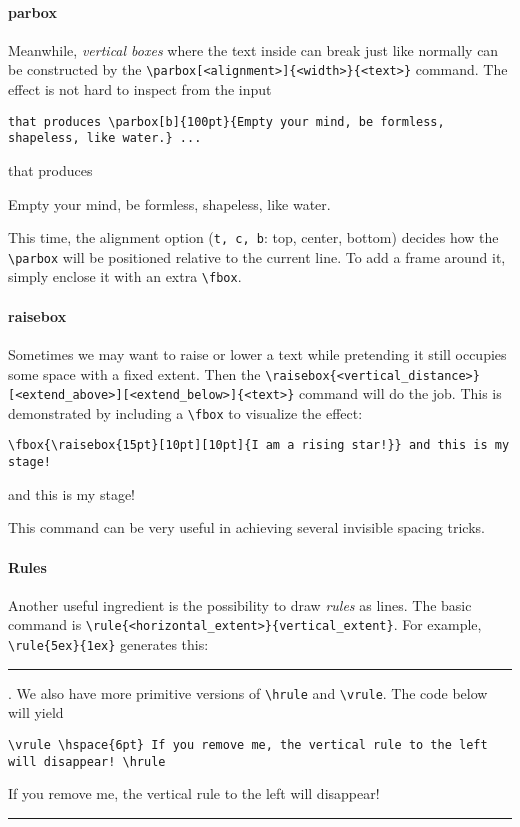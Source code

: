 \paragraph{parbox}
Meanwhile, \textit{vertical boxes} where the text inside can break just like normally can be constructed by the \texttt{\textbackslash parbox[<alignment>]\{<width>\}\{<text>\}} command. The effect is not hard to inspect from the input
\begin{lstlisting}
that produces \parbox[b]{100pt}{Empty your mind, be formless, shapeless, like water.} ...
\end{lstlisting}
that produces \parbox[b]{100pt}{Empty your mind, be formless, shapeless, like water.} This time, the alignment option (\verb|t, c, b|: top, center, bottom) decides how the \texttt{\textbackslash parbox} will be positioned relative to the current line. To add a frame around it, simply enclose it with an extra \texttt{\textbackslash fbox}.

\paragraph{raisebox}
Sometimes we may want to raise or lower a text while pretending it still occupies some space with a fixed extent. Then the \texttt{\textbackslash raisebox\{<vertical\allowbreak\_distance>\}[<extend\_above>][<extend\_below>]\{<text>\}} command will do the job. This is demonstrated by including a \texttt{\textbackslash fbox} to visualize the effect:
\begin{lstlisting}
\fbox{\raisebox{15pt}[10pt][10pt]{I am a rising star!}} and this is my stage!
\end{lstlisting}
\fbox{\raisebox{15pt}[10pt][10pt]{I am a rising star!}} and this is my stage!\par
This command can be very useful in achieving several invisible spacing tricks.

\paragraph{Rules}
Another useful ingredient is the possibility to draw \textit{rules} as lines. The basic command is \texttt{\textbackslash rule\{<horizontal\_extent>\}\{vertical\_extent\}}. For example, \texttt{\textbackslash rule\{5ex\}\{1ex\}} generates this: \rule{5ex}{1ex}. We also have more primitive versions of \texttt{\textbackslash hrule} and \texttt{\textbackslash vrule}. The code below will yield
\begin{lstlisting}
\vrule \hspace{6pt} If you remove me, the vertical rule to the left will disappear! \hrule
\end{lstlisting}
\vrule \hspace{6pt} If you remove me, the vertical rule to the left will disappear!  \hrule

